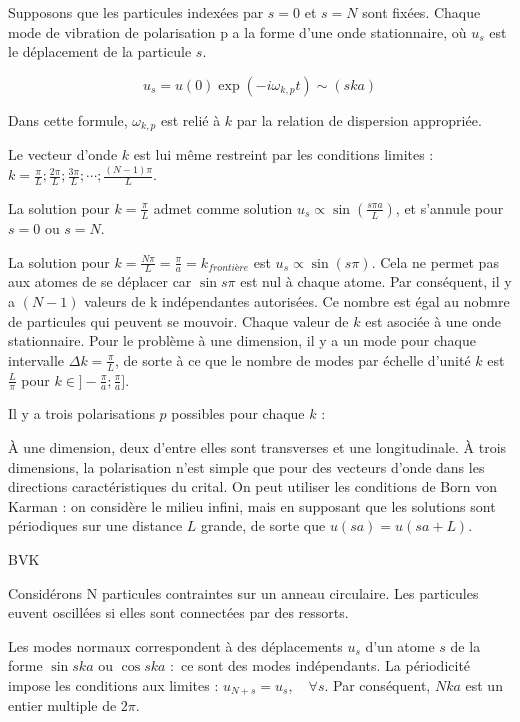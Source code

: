 Supposons que les particules indexées par $s=0$ et $s=N$ sont fixées.
Chaque mode de vibration de polarisation p a la forme d'une onde stationnaire,
où $u_s$ est le déplacement de la particule $s$.

\begin{equation}
    u_s = u(0) \exp (-i \omega_{k,p} t) \sim (ska)
\end{equation}

Dans cette formule, $\omega_{k,p}$ est relié à $k$ par la relation de dispersion
appropriée.

Le vecteur d'onde $k$ est lui même restreint par les conditions limites :
$k = \frac{\pi}{L} ; \frac{2 \pi}{L} ; \frac{3\pi}{L} ; \cdots ; \frac{(N-1)\pi}{L} $.

La solution pour $k=\frac{\pi}{L}$ admet comme solution $u_s \propto \sin \left(\frac{s\pi a}{L} \right)$, et s'annule pour $s=0$ ou $s=N$.

La solution pour $k=\frac{N\pi}{L} = \frac{\pi}{a} = k_{frontière}$ est
$u_s \propto \sin (s\pi)$. Cela ne permet pas aux atomes de se déplacer car
$\sin s\pi$ est nul à chaque atome. Par conséquent, il y a $(N-1)$ valeurs de k
indépendantes autorisées. Ce nombre est égal au nobmre de particules qui peuvent
se mouvoir. Chaque valeur de $k$ est asociée à une onde stationnaire. Pour le
problème à une dimension, il y a un mode pour chaque intervalle
$\Delta k = \frac{\pi}{L}$, de sorte à ce que le nombre de modes par échelle
d'unité $k$ est $\frac{L}{\pi}$ pour $k \in ]-\frac{\pi}{a} ; \frac{\pi}{a} ]$.

Il y a trois polarisations $p$ possibles pour chaque $k$ :

À une dimension, deux d'entre elles sont transverses et une longitudinale.
À trois dimensions, la polarisation n'est simple que pour des vecteurs d'onde
dans les directions caractéristiques du crital. On peut utiliser les conditions
de Born von Karman : on considère le milieu infini, mais en supposant que les
solutions sont périodiques sur une distance $L$ grande, de sorte que
$u(sa) = u(sa + L)$.

\begin{marginfigure}
    \TODO
    \caption{BVK}
\end{marginfigure}

Considérons N particules contraintes sur un anneau circulaire. Les particules euvent oscillées si elles sont connectées par des ressorts.

Les modes normaux correspondent à des déplacements $u_s$ d'un atome $s$ de la
forme $\sin ska$ ou $\cos ska$ : ce sont des modes indépendants. La périodicité
impose les conditions aux limites : $u_{N+s} = u_s,\quad \forall s$. Par
conséquent, $Nka$ est un entier multiple de $2\pi$.

